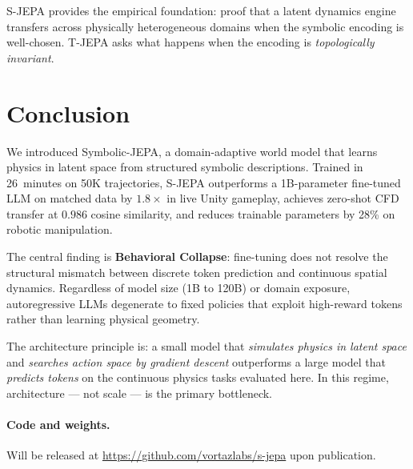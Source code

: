 \documentclass[10pt,twocolumn]{article}
\begin{document}
S-JEPA provides the empirical foundation: proof that a latent dynamics engine transfers
across physically heterogeneous domains when the symbolic encoding is well-chosen.
T-JEPA asks what happens when the encoding is \emph{topologically invariant}.

\section{Conclusion}
\label{sec:conclusion}

We introduced Symbolic-JEPA, a domain-adaptive world model that learns physics in latent
space from structured symbolic descriptions. Trained in 26~minutes on 50K trajectories,
S-JEPA outperforms a 1B-parameter fine-tuned LLM on matched data by $1.8\times$ in live
Unity gameplay, achieves zero-shot CFD transfer at $0.986$ cosine similarity, and reduces
trainable parameters by 28\% on robotic manipulation.

The central finding is \textbf{Behavioral Collapse}: fine-tuning does not resolve the
structural mismatch between discrete token prediction and continuous spatial dynamics.
Regardless of model size (1B to 120B) or domain exposure, autoregressive LLMs degenerate
to fixed policies that exploit high-reward tokens rather than learning physical geometry.

The architecture principle is: a small model that \emph{simulates physics in latent
space} and \emph{searches action space by gradient descent} outperforms a large model that
\emph{predicts tokens} on the continuous physics tasks evaluated here.
In this regime, architecture — not scale — is the primary bottleneck.

\paragraph{Code and weights.}
Will be released at \url{https://github.com/vortazlabs/s-jepa} upon publication.


\end{document}
